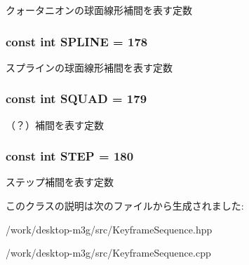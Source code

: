 クォータニオンの球面線形補間を表す定数 \hypertarget{classm3g_1_1KeyframeSequence_fbb002ac924c1349dead17c16b6fa720}{
\subsubsection[{SPLINE}]{\setlength{\rightskip}{0pt plus 5cm}const int {\bf SPLINE} = 178}}
\label{classm3g_1_1KeyframeSequence_fbb002ac924c1349dead17c16b6fa720}


スプラインの球面線形補間を表す定数 \hypertarget{classm3g_1_1KeyframeSequence_0ad85e76e101b5eabf5a5c5f48648845}{
\subsubsection[{SQUAD}]{\setlength{\rightskip}{0pt plus 5cm}const int {\bf SQUAD} = 179}}
\label{classm3g_1_1KeyframeSequence_0ad85e76e101b5eabf5a5c5f48648845}


（？）補間を表す定数 \hypertarget{classm3g_1_1KeyframeSequence_07dc1c0bf7f480095150d1b1c34c8218}{
\subsubsection[{STEP}]{\setlength{\rightskip}{0pt plus 5cm}const int {\bf STEP} = 180}}
\label{classm3g_1_1KeyframeSequence_07dc1c0bf7f480095150d1b1c34c8218}


ステップ補間を表す定数 

このクラスの説明は次のファイルから生成されました:\begin{CompactItemize}
\item 
/work/desktop-m3g/src/KeyframeSequence.hpp\item 
/work/desktop-m3g/src/KeyframeSequence.cpp\end{CompactItemize}

